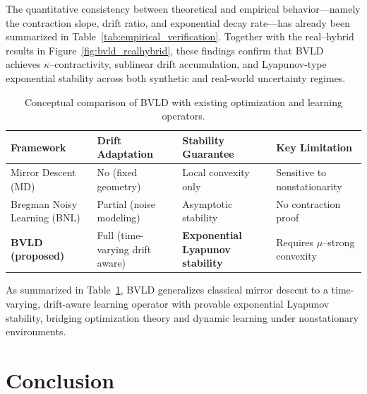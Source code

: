 \documentclass[11pt]{article}
\theoremstyle{plain}
\theoremstyle{definition}
\theoremstyle{remark}
\begin{document}
\medskip
\noindent
The quantitative consistency between theoretical and empirical behavior—namely 
the contraction slope, drift ratio, and exponential decay rate—has already been 
summarized in Table~\ref{tab:empirical_verification}.  
Together with the real–hybrid results in 
Figure~\ref{fig:bvld_realhybrid}, these findings confirm that BVLD achieves 
$\kappa$–contractivity, sublinear drift accumulation, and Lyapunov-type exponential 
stability across both synthetic and real-world uncertainty regimes.


\begin{table}[htbp]
\centering
\caption{Conceptual comparison of BVLD with existing optimization and learning operators.}
\label{tab:comparison}
\renewcommand{\arraystretch}{1.1} 
\setlength{\tabcolsep}{4pt}       
\begin{tabularx}{\linewidth}{lXXX} %
\toprule
\textbf{Framework} & \textbf{Drift Adaptation} & \textbf{Stability Guarantee} & \textbf{Key Limitation} \\
\midrule
Mirror Descent (MD) 
& No (fixed geometry) 
& Local convexity only 
& Sensitive to nonstationarity \\

Bregman Noisy Learning (BNL) 
& Partial (noise modeling) 
& Asymptotic stability 
& No contraction proof \\

\textbf{BVLD (proposed)} 
& Full (time-varying drift aware) 
& \textbf{Exponential Lyapunov stability} 
& Requires $\mu$–strong convexity \\
\bottomrule
\end{tabularx}
\end{table}


\medskip
\noindent
As summarized in Table~\ref{tab:comparison}, BVLD generalizes classical mirror descent 
to a time-varying, drift-aware learning operator with provable exponential Lyapunov 
stability, bridging optimization theory and dynamic learning under nonstationary environments.


\section{Conclusion}
\label{sec:conclusion}
\end{document}
